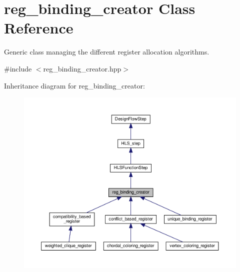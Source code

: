 \hypertarget{classreg__binding__creator}{}\section{reg\+\_\+binding\+\_\+creator Class Reference}
\label{classreg__binding__creator}


Generic class managing the different register allocation algorithms.  




{\ttfamily \#include $<$reg\+\_\+binding\+\_\+creator.\+hpp$>$}



Inheritance diagram for reg\+\_\+binding\+\_\+creator\+:
\nopagebreak
\begin{figure}[H]
\begin{center}
\leavevmode
\includegraphics[width=350pt]{db/d89/classreg__binding__creator__inherit__graph}
\end{center}
\end{figure}


